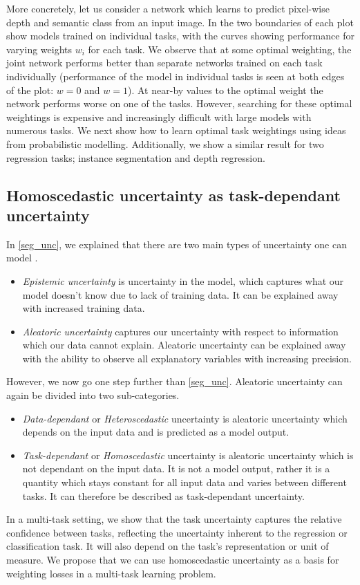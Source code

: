 More concretely, let us consider a network which learns to predict pixel-wise depth and semantic class from an input image. In  the two boundaries of each plot show models trained on individual tasks, with the curves showing performance for varying weights $w_i$ for each task. We observe that at some optimal weighting, the joint network performs better than separate networks trained on each task individually (performance of the model in individual tasks is seen at both edges of the plot: $w=0$ and $w=1$). At near-by values to the optimal weight the network performs worse on one of the tasks. However, searching for these optimal weightings is expensive and increasingly difficult with large models with numerous tasks. We next show how to learn optimal task weightings using ideas from probabilistic modelling. Additionally, we show a similar result for two regression tasks; instance segmentation and depth regression.

\subsection{Homoscedastic uncertainty as task-dependant uncertainty}
\label{sec:uncertainty}

In \cref{seg_unc}, we explained that there are two main types of uncertainty one can model \citep{kendall2017uncertainties}.
\begin{itemize}
\item \textit{Epistemic uncertainty} is uncertainty in the model, which captures what our model doesn’t know due to lack of training data. It can be explained away with increased training data.
\item \textit{Aleatoric uncertainty} captures our uncertainty with respect to information which our data cannot explain. Aleatoric uncertainty can be explained away with the ability to observe all explanatory variables with increasing precision.
\end{itemize}
However, we now go one step further than \cref{seg_unc}. Aleatoric uncertainty can again be divided into two sub-categories.
\begin{itemize}
\item \textit{Data-dependant} or \textit{Heteroscedastic} uncertainty is aleatoric uncertainty which depends on the input data and is predicted as a model output.
\item \textit{Task-dependant} or \textit{Homoscedastic} uncertainty is  aleatoric uncertainty which is not dependant on the input data. It is not a model output, rather it is a quantity which stays constant for all input data and varies between different tasks. It can therefore be described as task-dependant uncertainty.
\end{itemize}
In a multi-task setting, we show that the task uncertainty captures the relative confidence between tasks, reflecting the uncertainty inherent to the regression or classification task. It will also depend on the task's representation or unit of measure.  We propose that we can use homoscedastic uncertainty as a basis for weighting losses in a multi-task learning problem.

